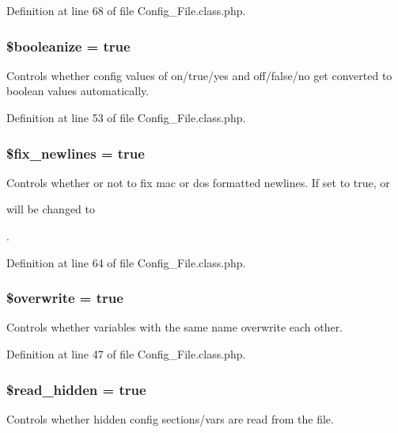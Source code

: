 \-Definition at line 68 of file \-Config\-\_\-\-File.\-class.\-php.

\hypertarget{class_config___file_af0cf19013c4ba6a4be61cd12d4d58176}{
\subsubsection[{\$booleanize}]{\setlength{\rightskip}{0pt plus 5cm}\$booleanize = true}}\label{class_config___file_af0cf19013c4ba6a4be61cd12d4d58176}
\-Controls whether config values of on/true/yes and off/false/no get converted to boolean values automatically. 

\-Definition at line 53 of file \-Config\-\_\-\-File.\-class.\-php.

\hypertarget{class_config___file_a2acc1a2a1a6e166957d9b731ff8afaa5}{
\subsubsection[{\$fix\-\_\-newlines}]{\setlength{\rightskip}{0pt plus 5cm}\$fix\-\_\-newlines = true}}\label{class_config___file_a2acc1a2a1a6e166957d9b731ff8afaa5}
\-Controls whether or not to fix mac or dos formatted newlines. \-If set to true,  or \par
 will be changed to \par
. 

\-Definition at line 64 of file \-Config\-\_\-\-File.\-class.\-php.

\hypertarget{class_config___file_a8d31b0ad9cccde7e2d857097672ed6cf}{
\subsubsection[{\$overwrite}]{\setlength{\rightskip}{0pt plus 5cm}\$overwrite = true}}\label{class_config___file_a8d31b0ad9cccde7e2d857097672ed6cf}
\-Controls whether variables with the same name overwrite each other. 

\-Definition at line 47 of file \-Config\-\_\-\-File.\-class.\-php.

\hypertarget{class_config___file_adc9cc2cebe0db470e85719ea48d9b40e}{
\subsubsection[{\$read\-\_\-hidden}]{\setlength{\rightskip}{0pt plus 5cm}\$read\-\_\-hidden = true}}\label{class_config___file_adc9cc2cebe0db470e85719ea48d9b40e}
\-Controls whether hidden config sections/vars are read from the file. 

